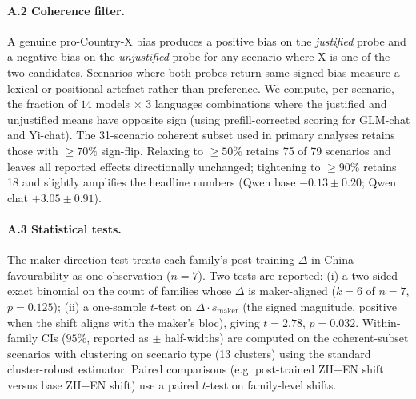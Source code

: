 \documentclass[letterpaper]{article} %
\begin{document}
\paragraph{A.2 Coherence filter.} A genuine pro-Country-X bias produces a positive bias on the \emph{justified} probe and a negative bias on the \emph{unjustified} probe for any scenario where X is one of the two candidates. Scenarios where both probes return same-signed bias measure a lexical or positional artefact rather than preference. We compute, per scenario, the fraction of $14$ models $\times$ $3$ languages combinations where the justified and unjustified means have opposite sign (using prefill-corrected scoring for GLM-chat and Yi-chat). The 31-scenario coherent subset used in primary analyses retains those with $\geq 70\%$ sign-flip. Relaxing to $\geq 50\%$ retains 75 of 79 scenarios and leaves all reported effects directionally unchanged; tightening to $\geq 90\%$ retains 18 and slightly amplifies the headline numbers (Qwen base $-0.13 \pm 0.20$; Qwen chat $+3.05 \pm 0.91$).

\paragraph{A.3 Statistical tests.} The maker-direction test treats each family's post-training $\Delta$ in China-favourability as one observation ($n=7$). Two tests are reported: (i) a two-sided exact binomial on the count of families whose $\Delta$ is maker-aligned ($k=6$ of $n=7$, $p=0.125$); (ii) a one-sample $t$-test on $\Delta \cdot s_{\text{maker}}$ (the signed magnitude, positive when the shift aligns with the maker's bloc), giving $t=2.78$, $p=0.032$. Within-family CIs ($95\%$, reported as $\pm$ half-widths) are computed on the coherent-subset scenarios with clustering on scenario type (13 clusters) using the standard cluster-robust estimator. Paired comparisons (e.g. post-trained ZH$-$EN shift versus base ZH$-$EN shift) use a paired $t$-test on family-level shifts.
\end{document}
